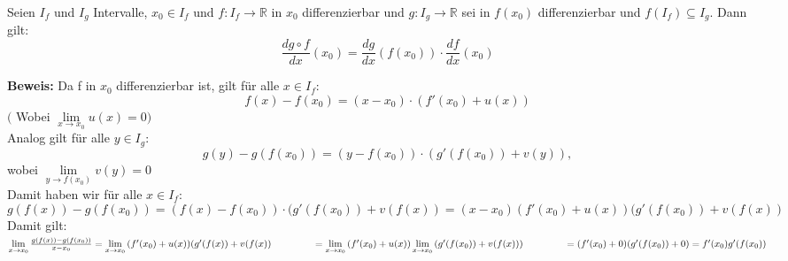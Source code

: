 \begin{Satz}[Kettenregel]{
	Seien $I_f$ und $I_g$ Intervalle, $x_0 \in I_f$ und 
	$f : I_f \rightarrow \mathbb{R}$ in $x_0$ differenzierbar und 
	$g: I_g \rightarrow \mathbb{R}$ sei in $f(x_0)$ differenzierbar und 
	$f(I_f) \subseteq I_g$. Dann gilt:
	\begin{equation*}
	\frac{d g \circ f}{dx}(x_0) = \frac{dg}{dx}(f(x_0)) \cdot \frac{df}{dx}(x_0)
	\end{equation*}
	
	\textbf{Beweis:}
	\noindent\hspace*{5mm} Da f in $x_0$ differenzierbar ist, gilt für alle 
	$x \in I_f$: \\
	\begin{equation*}
		f(x) -f(x_0) = (x-x_0) \cdot(f'(x_0) + u(x))
	\end{equation*}
	\noindent\hspace*{5mm}$($ Wobei $\lim\limits_{x \rightarrow x_0}{u(x) = 0})$ \\
	\noindent\hspace*{5mm}Analog gilt für alle $y \in I_g$: \\
	\begin{equation*}
		g(y) -g(f(x_0)) = (y-f(x_0)) \cdot (g'(f(x_0)) + v(y)),
	\end{equation*}		
	\noindent\hspace*{5mm}wobei $\lim\limits_{y \rightarrow f(x_0)}{v(y) = 0}$ \\
	\noindent\hspace*{5mm}Damit haben wir für alle $x \in I_f$: \\
	\begin{equation*}
	g(f(x)) - g(f(x_0)) = (f(x)-f(x_0)) \cdot (g'(f(x_0)) + v(f(x))
	= (x-x_0)(f'(x_0) + u(x)) (g'(f(x_0)) + v(f(x))
	\end{equation*}
	\noindent\hspace*{5mm}Damit gilt: \\
	\noindent\hspace*{15mm}$\lim\limits_{x \rightarrow x_0}
	{\frac{g(f(x))-g(f(x_0))}{x-x_0} } 
	= \lim\limits_{x \rightarrow x_0}{(f'(x_0) + u(x)) (g'(f(x)) + v(f(x))}
	\\ \noindent\hspace*{15mm}
	= \lim\limits_{x \rightarrow x_0}{(f'(x_0) + u(x))} 
	\lim\limits_{x \rightarrow x_0}{(g'(f(x_0)) + v(f(x)))}
	 \\ \noindent\hspace*{15mm}
	= (f'(x_0) + 0) (g'(f(x_0)) + 0)
	= f'(x_0) g'(f(x_0))$
}\end{Satz}

